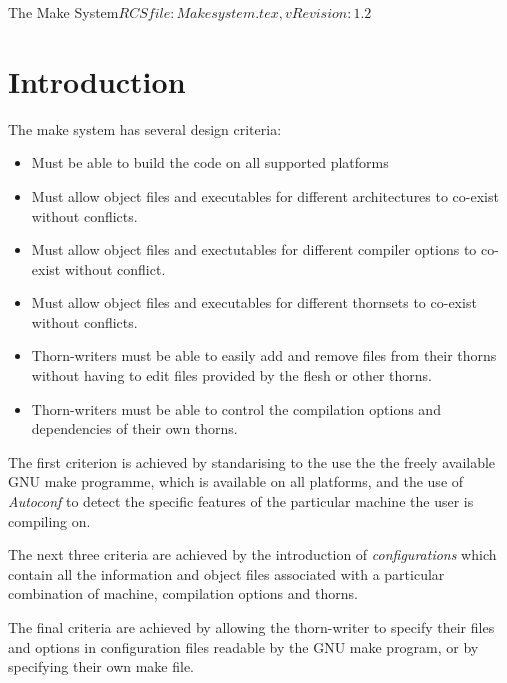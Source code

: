 %   

\begin{cactuspart}{3}{The Make System}{$RCSfile: Makesystem.tex,v $}{$Revision: 1.2 $}
\renewcommand{\thepage}{\Alph{part}\arabic{page}}

\chapter{Introduction}

The make system has several design criteria:

\begin{itemize}
\item[]
Must be able to build the code on all supported platforms
\item[]
Must allow object files and executables for different architectures to 
co-exist without conflicts.
\item[]
Must allow object files and exectutables for different compiler options to
co-exist without conflict.
\item[]
Must allow object files and executables for different thornsets to 
co-exist without conflicts.
\item[]
Thorn-writers must be able to easily add and remove files from their
thorns without having to edit files provided by the flesh or other thorns.
\item[]
Thorn-writers must be able to control the compilation options and 
dependencies of their own thorns.
\end{itemize}

The first criterion is achieved by standarising to the use the the freely
available GNU make programme, which is available on all platforms, and
the use of {\em Autoconf} to detect the specific features of the particular
machine the user is compiling on.

The next three criteria are achieved by the introduction of {\em configurations}
which contain all the information and object files associated with a 
particular combination of machine, compilation options and thorns.

The final criteria are achieved by allowing the thorn-writer to specify their
files and options in configuration files readable by the GNU make program,
or by specifying their own make file.


\end{cactuspart}
